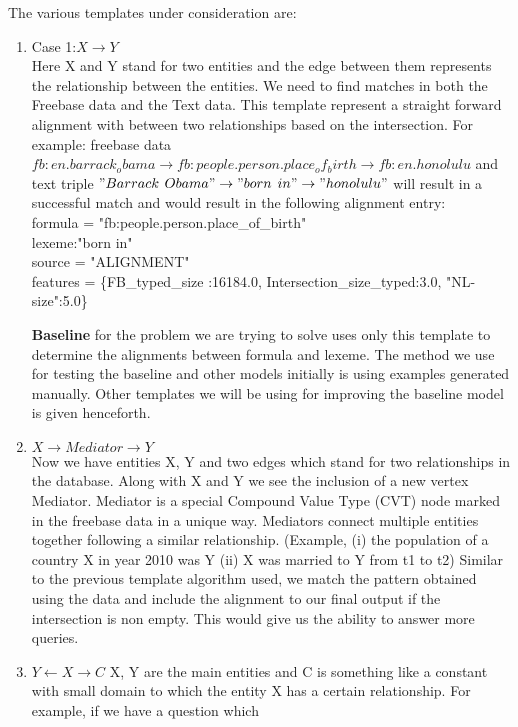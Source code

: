 \documentclass[12pt, a4paper]{article}
\begin{document}
The various templates under consideration are:
\begin{enumerate}
	\item Case 1:$X\rightarrow Y$\\
	Here X and Y stand for two entities and the edge between them represents the relationship between the entities. We need to find matches in both the Freebase data and the Text data. This template represent a straight forward alignment with between two relationships based on the intersection. For example: freebase data $fb:en.barrack_obama \rightarrow	fb:people.person.place_of_birth \rightarrow	fb:en.honolulu$ and text triple $"Barrack$ $Obama" \rightarrow "born$ $in" \rightarrow "honolulu"$ will result in a successful match and would result in the following alignment entry:\\
	
formula = "fb:people.person.place\_of\_birth"\\
lexeme:"born in"\\
source = "ALIGNMENT"\\
features = \{FB\_typed\_size :16184.0, Intersection\_size\_typed:3.0, "NL-size":5.0\}

{\bf Baseline} for the problem we are trying to solve uses only this template to determine the alignments between formula and lexeme. The method we use for testing the baseline and other models initially is using examples generated manually. Other templates we will be using for improving the baseline model is given henceforth.

 
	\item $X\rightarrow Mediator \rightarrow Y$\\
	Now we have entities X, Y and two edges which stand for two relationships in the database. Along with X and Y we see the inclusion of a new vertex Mediator. Mediator is a special Compound Value Type (CVT) node marked in the freebase data in a unique way. Mediators connect multiple entities together following a similar relationship. (Example, (i) the population of a country X in year 2010 was Y (ii) X was married to Y from t1 to t2) Similar to the previous template algorithm used, we match the pattern obtained using the data and include the alignment to our final output if the intersection is non empty. This would give us the ability to answer more queries. 
	
	\item $Y\leftarrow X \rightarrow C$
	X, Y are the main entities and C is something like a constant with small domain to which the entity X has a certain relationship. For example, if we have a question which 
	
\end{enumerate}
\end{document}
